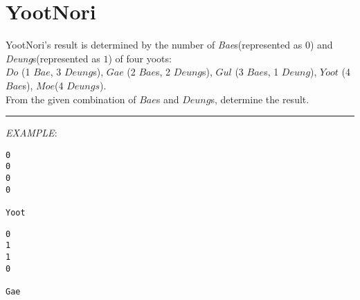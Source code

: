\documentclass{article}
\begin{document}
\pagebreak
\section{YootNori}
YootNori's result is determined by the number of \textit{Bae}s(represented as
$0$) and \textit{Deung}s(represented as $1$) of four yoots:\\
$Do$ (1 $Bae$, 3 $Deung$s), $Gae$ (2 $Bae$s, 2 $Deung$s), $Gul$ (3 $Bae$s, 1
$Deung$), $Yoot$ (4 $Bae$s), $Moe$(4 $Deungs$).\\
From the given combination of $Bae$s and $Deung$s, determine the result.\\
\noindent\rule{\textwidth}{0.9pt}
\textit{EXAMPLE}:\\
\begin{lstlisting}
0
0
0
0

Yoot
\end{lstlisting}
\begin{lstlisting}
0
1
1
0

Gae
\end{lstlisting}
\end{document}
